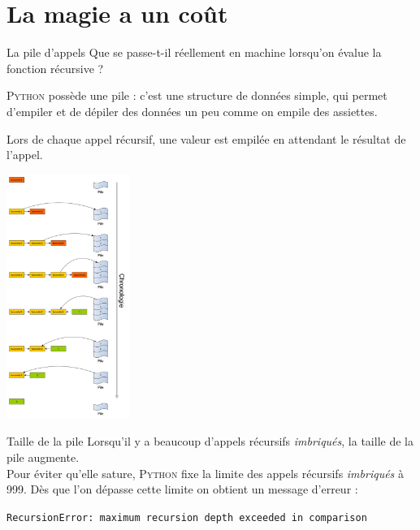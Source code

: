 \documentclass[10pt]{beamer}
\begin{document}
\section{La \og magie\fg{} a un coût}




\begin{frame}{La pile d'appels}
Que se passe-t-il réellement en machine lorsqu'on évalue la fonction récursive  ?\\\pause

\textsc{Python} possède une \alert{pile} : c'est une structure de données simple, qui permet d'empiler et de dépiler des données un peu comme on empile des assiettes.\\  \pause

Lors de chaque appel récursif, une valeur est empilée en attendant le résultat de l'appel.
\end{frame}





\begin{frame}{}
\begin{center}
\includegraphics[width=4cm]{img/appels}
\end{center}
\end{frame}





\begin{frame}{Taille de la pile}
Lorsqu'il y a beaucoup d'appels récursifs \textit{imbriqués}, la taille de la pile augmente.\\\pause
Pour éviter qu'elle sature, \textsc{Python} fixe la limite des appels récursifs \textit{imbriqués} à 999. Dès que l'on dépasse cette limite on obtient un message d'erreur :\\\pause

\color{red} \texttt{\footnotesize RecursionError: maximum recursion depth exceeded in comparison}\color{black}\\
\end{frame}
\end{document}
